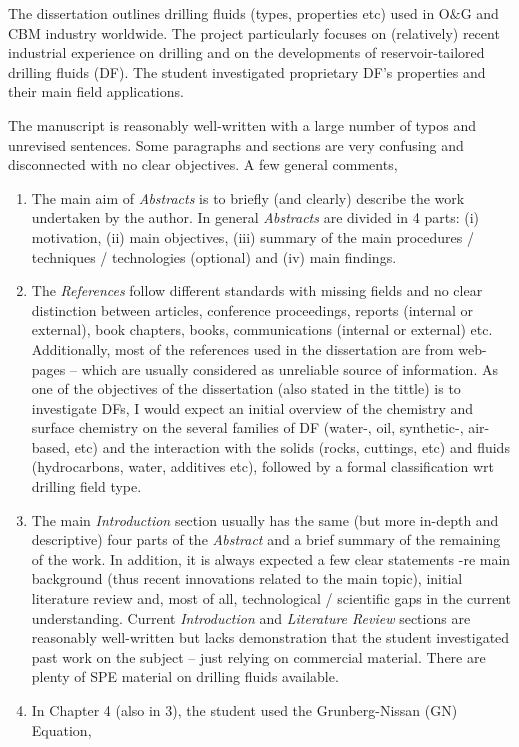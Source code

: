 \documentclass[14pt,twoside]{report}
\begin{document}
\medskip
The dissertation outlines drilling fluids (types, properties etc) used in O$\&$G and CBM industry worldwide. The project particularly focuses on (relatively) recent industrial experience on drilling and on the developments of reservoir-tailored drilling fluids (DF). The student investigated proprietary  DF's properties and their main field applications.  

The manuscript is reasonably well-written with a large number of typos and unrevised sentences. Some paragraphs and sections are very confusing and disconnected with no clear objectives. A few general comments,
\begin{enumerate}
%
\item The main aim of {\it Abstracts} is to briefly (and clearly) describe the work undertaken by the author. In general {\it Abstracts} are divided in 4 parts: (i) motivation, (ii) main objectives, (iii) summary of the main procedures / techniques / technologies (optional) and (iv) main findings. 
%
\item The {\it References} follow different standards with missing fields and no clear distinction between articles, conference proceedings, reports (internal or external), book chapters, books, communications (internal or external) etc.  Additionally, most of the references used in the dissertation are from web-pages -- which are usually considered as unreliable source of information. As one of the objectives of the dissertation (also stated in the tittle) is to investigate DFs, I would expect an initial overview of the chemistry and surface chemistry on the several families of DF (water-, oil, synthetic-, air-based, etc) and the interaction with the solids (rocks, cuttings, etc) and fluids (hydrocarbons, water, additives etc), followed by a formal classification wrt drilling field type.
%
\item The main {\it Introduction} section usually has the same (but more in-depth and descriptive) four parts of the {\it Abstract} and a brief summary of the remaining of the work. In addition, it is always expected a few clear statements -re main background (thus recent innovations related to the main topic), initial literature review and, most of all, technological / scientific gaps in the current understanding. Current {\it Introduction} and {\it Literature Review} sections are reasonably well-written but lacks demonstration that the student investigated past work on the subject -- just relying on commercial material.  There are plenty of SPE material on drilling fluids available.
%
\item In Chapter 4 (also in 3), the student used the Grunberg-Nissan (GN) Equation,

\end{enumerate}
\end{document}
